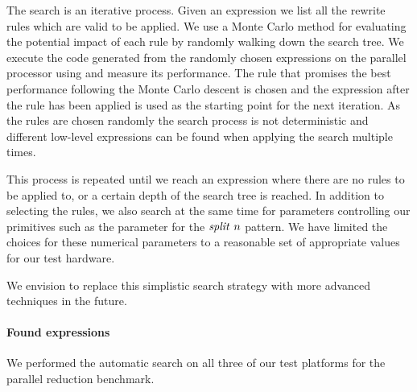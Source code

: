 The search is an iterative process.
Given an expression we list all the rewrite rules which are valid to be applied.
We use a Monte Carlo method for evaluating the potential impact of each rule by randomly walking down the search tree.
We execute the code generated from the randomly chosen expressions on the parallel processor using \OpenCL and measure its performance.
The rule that promises the best performance following the Monte Carlo descent is chosen and the expression after the rule has been applied is used as the starting point for the next iteration.
As the rules are chosen randomly the search process is not deterministic and different low-level expressions can be found when applying the search multiple times.

This process is repeated until we reach an expression where there are no rules to be applied to, or a certain depth of the search tree is reached.
In addition to selecting the rules, we also search at the same time for parameters controlling our primitives such as the parameter for the $\text{\textit{split}}\ n$ pattern.
We have limited the choices for these numerical parameters to a reasonable set of appropriate values for our test hardware.

We envision to replace this simplistic search strategy with more advanced techniques in the future.

\paragraph{Found expressions}
We performed the automatic search on all three of our test platforms for the parallel reduction benchmark.

